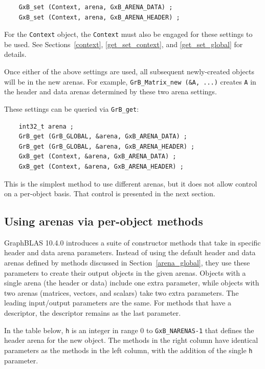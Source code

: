     {\footnotesize
    \begin{verbatim}
    GxB_set (Context, arena, GxB_ARENA_DATA) ;
    GxB_set (Context, arena, GxB_ARENA_HEADER) ; \end{verbatim}}

For the \verb'Context' object, the \verb'Context' must also be engaged for
these settings to be used.  See Sections~\ref{context}, \ref{get_set_context},
and \ref{get_set_global} for details.

Once either of the above settings are used, all subsequent newly-created
objects will be in the new arenas.  For example,
\verb'GrB_Matrix_new (&A, ...)' creates \verb'A' in the header and
data arenas determined by these two arena settings.

These settings can be queried via \verb'GrB_get':

    {\footnotesize
    \begin{verbatim}
    int32_t arena ;
    GrB_get (GrB_GLOBAL, &arena, GxB_ARENA_DATA) ;
    GrB_get (GrB_GLOBAL, &arena, GxB_ARENA_HEADER) ;
    GxB_get (Context, &arena, GxB_ARENA_DATA) ;
    GxB_get (Context, &arena, GxB_ARENA_HEADER) ; \end{verbatim}}

This is the simplest method to use different arenas, but it does not allow
control on a per-object basis.  That control is presented in the next section.

\subsection{Using arenas via per-object methods}

GraphBLAS 10.4.0 introduces a suite of constructor methods that take in
specific header and data arena parameters.  Instead of using the default header
and data arenas defined by methods discussed in Section~\ref{arena_global},
they use these parameters to create their output objects in the given arenas.
Objects with a single arena (the header or data) include one extra parameter,
while objects with two arenas (matrices, vectors, and scalars) take two extra
parameters.  The leading input/output parameters are the same.  For methods
that have a descriptor, the descriptor remains as the last parameter.

In the table below, \verb'h' is an integer in range 0 to \verb'GxB_NARENAS-1'
that defines the header arena for the new object.  The methods in the right
column have identical parameters as the methods in the left column,
with the addition of the single \verb'h' parameter.

